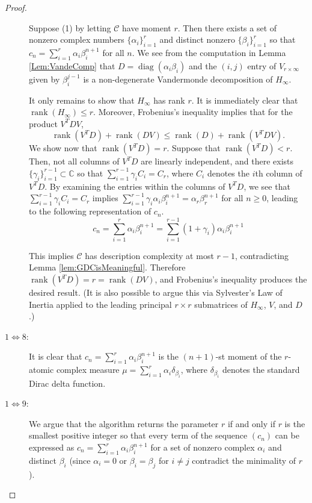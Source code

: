 \documentclass[12pt,reqno]{article}
\DeclareMathOperator{\diag}{diag}
\DeclareMathOperator{\rank}{rank}
\begin{document}
\begin{proof}
\begin{description}
Suppose (1) by letting $\mathcal{C}$ have moment $r$. Then there exists a set of nonzero complex numbers $\{\alpha_i\}_{i=1}^r$ and distinct nonzero $\{\beta_i\}_{i=1}^r$ so that $c_n=\sum_{i=1}^r \alpha_i \beta_i^{n+1}$ for all $n$. We see from the computation in Lemma \ref{Lem:VandeComp} that $D = \diag(\alpha_i\beta_i)$ and the $(i,j)$ entry of $V_{r\times\infty}$ given by $\beta_i^{j-1}$ is a non-degenerate Vandermonde decomposition of $H_\infty$. 

It only remains to show that $H_\infty$ has rank $r$. 
It is immediately clear that $\rank(H_\infty)\leq r$. Moreover, Frobenius's inequality \cite[0.4.5(e)]{HorJoh2013} implies that for the product $V^TDV$, 
$$
\rank(V^TD)+\rank(DV)\leq \rank(D)+\rank(V^TDV).
$$ 
We show now that $\rank(V^TD) = r$. Suppose that $\rank(V^TD)<r$. Then, not all columns of $V^TD$ are linearly independent, and there exists $\{\gamma_i\}_{i=1}^{r-1} \subset \mathbb{C}$ so that $\sum_{i=1}^{r-1} \gamma_i C_i = C_r$, where $C_i$ denotes the $i$th column of $V^TD$. By examining the entries within the columns of $V^TD$, we see that $\sum_{i=1}^{r-1} \gamma_i C_i = C_r$ implies $\sum_{i=1}^{r-1} \gamma_i\alpha_i\beta_i^{n+1} = \alpha_r\beta_r^{n+1}$ for all $n\geq 0$, leading to the following representation of $c_n$. 
$$
c_n = \sum_{i=1}^r \alpha_i \beta_i^{n+1} = \sum_{i=1}^{r-1} (1+\gamma_i)\alpha_i\beta_i^{n+1}
$$

This implies $\mathcal{C}$ has description complexity at most $r-1$, contradicting Lemma \ref{lem:GDCisMeaningful}. Therefore $\rank(V^TD) = r = \rank(DV)$, and Frobenius's inequality produces the desired result.  (It is also possible to argue this via Sylvester's Law of Inertia applied to the leading principal $r \times r$ submatrices of $H_\infty$, $V$, and $D$.)

\item[$1 \Leftrightarrow 8$:] It is clear that $c_n = \sum_{i=1}^r \alpha_i\beta_i^{n+1}$ is the $(n+1)$-st moment of the $r$-atomic complex measure $\mu = \sum_{i=1}^r \alpha_i \delta_{\beta_i}$, where $\delta_{\beta_i}$ denotes the standard Dirac delta function.

\item[$1 \Leftrightarrow 9$:] We argue that the algorithm returns the parameter $r$ if and only if $r$ is the smallest positive integer so that every term of the sequence $(c_n)$ can be expressed as $c_n = \sum_{i=1}^r \alpha_i \beta_i^{n+1}$ for a set of nonzero complex $\alpha_i$ and distinct $\beta_i$ (since $\alpha_i =0$ or $\beta_i = \beta_j$ for $i \neq j$ contradict the minimality of $r$). 


\end{description}
\end{proof}
\end{document}

